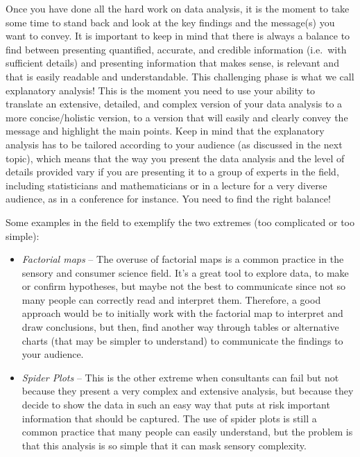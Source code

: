 \documentclass[
]{krantz}
\providecommand{\tightlist}{%
  \setlength{\itemsep}{0pt}\setlength{\parskip}{0pt}}
\begin{document}
Once you have done all the hard work on data analysis, it is the moment to take some time to stand back and look at the key findings and the message(s) you want to convey. It is important to keep in mind that there is always a balance to find between presenting quantified, accurate, and credible information (i.e.~with sufficient details) and presenting information that makes sense, is relevant and that is easily readable and understandable. This challenging phase is what we call explanatory analysis! This is the moment you need to use your ability to translate an extensive, detailed, and complex version of your data analysis to a more concise/holistic version, to a version that will easily and clearly convey the message and highlight the main points. Keep in mind that the explanatory analysis has to be tailored according to your audience (as discussed in the next topic), which means that the way you present the data analysis and the level of details provided vary if you are presenting it to a group of experts in the field, including statisticians and mathematicians or in a lecture for a very diverse audience, as in a conference for instance. You need to find the right balance!

Some examples in the field to exemplify the two extremes (too complicated or too simple):

\begin{itemize}
\tightlist
\item
  \emph{Factorial maps} -- The overuse of factorial maps is a common practice in the sensory and consumer science field. It's a great tool to explore data, to make or confirm hypotheses, but maybe not the best to communicate since not so many people can correctly read and interpret them. Therefore, a good approach would be to initially work with the factorial map to interpret and draw conclusions, but then, find another way through tables or alternative charts (that may be simpler to understand) to communicate the findings to your audience.
\item
  \emph{Spider Plots} -- This is the other extreme when consultants can fail but not because they present a very complex and extensive analysis, but because they decide to show the data in such an easy way that puts at risk important information that should be captured. The use of spider plots is still a common practice that many people can easily understand, but the problem is that this analysis is so simple that it can mask sensory complexity.
\end{itemize}
\end{document}
